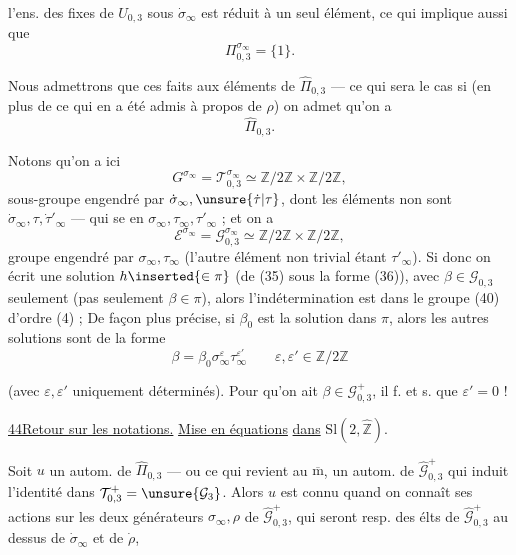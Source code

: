 
l'ens. des  fixes de $U_{0,3}$ sous $\dot{\sigma}_\infty$ est réduit à un seul élément, ce qui implique aussi que
\[
\Pi_{0,3}^{\sigma_\infty}=\{1\}.
\]

Nous admettrons  que ces faits  aux éléments de $\widehat{\Pi}_{0,3}$ --- ce qui sera le cas si (en plus de ce qui en a été admis à propos de $\rho$) on admet qu'on a 
\[
\tag{38}
\widehat{\Pi}_{0,3}.
\]

Notons qu'on a ici
\[
\tag{39}
G^{\sigma_\infty}=\mathcal T_{0,3}^{\sigma_\infty}\simeq\mathbb Z/2\mathbb Z\times\mathbb Z/2\mathbb Z,
\]
sous-groupe engendré par $\dot{\sigma}_\infty,\unsure{\dot\tau|\tau}$, dont les éléments non  sont $\dot{\sigma}_\infty,\tau,\dot{\tau}'_\infty$ --- qui se  en $\sigma_\infty,\tau_\infty,\tau'_\infty$ ; et on a
\[
\tag{40}
\mathcal E^{\sigma_\infty}=\mathcal G_{0,3}^{\sigma_\infty}\simeq\mathbb Z/2\mathbb Z\times\mathbb Z/2\mathbb Z,
\]
groupe engendré par $\sigma_\infty,\tau_\infty$ (l'autre élément non trivial étant $\tau'_\infty$). Si donc on écrit une solution $h\inserted{\in\pi}$ (de (35) sous la forme (36)), avec $\beta\in\mathcal G_{0,3}$ seulement (pas seulement $\beta\in\pi$), alors l'indétermination est dans le groupe (40) d'ordre (4) ; De façon plus précise, si $\beta_0$ est la solution dans $\pi$, alors les autres solutions sont de la forme
\[
\tag{41}
\beta=\beta_0\sigma_\infty^\varepsilon\tau_\infty^{\varepsilon'}
\qquad \varepsilon,\varepsilon'\in\mathbb Z/2\mathbb Z
\]



(avec $\varepsilon,\varepsilon'$ uniquement déterminés). Pour qu'on ait $\beta\in\mathcal G_{0,3}^{+}$, il f. et s. que $\varepsilon'=0$ !




\uline{44}\qquad \uline{Retour sur les notations.} \uline{Mise en équations} \uline{dans} $\mathrm{Sl}(2,\widehat{\mathbb Z})$.

Soit $u$ un autom. de $\widehat{\Pi}_{0,3}$  --- ou ce qui revient au $\overline{\mathrm m}$, un autom. de $\widehat{\mathcal G}_{0,3}^{+}$ qui induit l'identité dans $\mathcal T_{0,3}^{+}=\unsure{\mathcal G_3}$. Alors $u$ est connu quand on connaît ses actions sur les deux générateurs $\sigma_\infty,\rho$ de $\widehat{\mathcal G}_{0,3}^{+}$, qui seront resp. des élts de $\widehat{\mathcal G}_{0,3}^{+}$ au dessus de $\dot{\sigma}_\infty$ et de $\dot\rho$,

